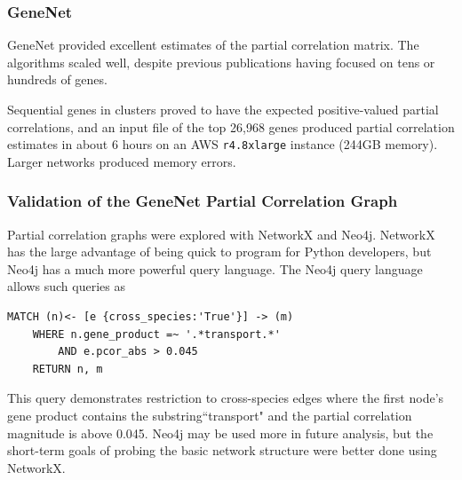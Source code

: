 \subsubsection{GeneNet}
GeneNet provided excellent estimates of the partial correlation matrix.
The algorithms scaled well, despite previous publications having focused on tens or hundreds of genes.

Sequential genes in clusters proved to have the expected positive-valued partial correlations, and an input file of the top 26,968 genes produced partial correlation estimates in about 6 hours on an AWS \texttt{r4.8xlarge} instance (244GB memory). %
Larger networks produced memory errors.

\subsubsection{Validation of the GeneNet Partial Correlation Graph}

Partial correlation graphs were explored with NetworkX and Neo4j.
NetworkX has the large advantage of being quick to program for Python developers, but Neo4j has a much more powerful query language.
The Neo4j query language allows such queries as
\begin{verbatim}
MATCH (n)<- [e {cross_species:'True'}] -> (m)
    WHERE n.gene_product =~ '.*transport.*'
        AND e.pcor_abs > 0.045
    RETURN n, m
\end{verbatim}
This query demonstrates restriction to cross-species edges where the first node's gene product contains the substring``transport" and the partial correlation magnitude is above 0.045.
Neo4j may be used more in future analysis, but the short-term goals of probing the basic network structure were better done using NetworkX.

